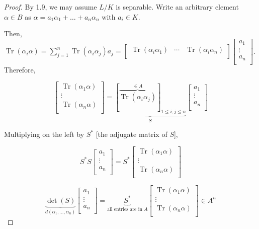 \documentclass[openany]{amsbook}
\numberwithin{section}{chapter}
\theoremstyle{definition}
\newcommand{\Tr}{\operatorname{Tr}}
\begin{document}
\begin{proof}
    By 1.9, we may assume \(L / K\) is separable. Write an arbitrary element \(\alpha \in B\) as \(\alpha = a_1 \alpha _1 + \dots + a_n \alpha_n\) with \(a_i \in K\).

    Then, \(\Tr(\alpha_i \alpha) = \sum_{j=1}^{n} \Tr(\alpha_i \alpha_j)a_j = \begin{bmatrix}
        \Tr(\alpha_i \alpha_1) & \cdots &  \Tr(\alpha_i \alpha_n)  \\
    \end{bmatrix}\begin{bmatrix}
        a_1 \\
        \vdots \\
        a_n \\
   \end{bmatrix}\). Therefore,

   \[
    \begin{bmatrix}
        \Tr(\alpha_1 \alpha) \\
        \vdots \\
        \Tr(\alpha_n \alpha) \\
      \end{bmatrix}=\underbrace{[\overbrace{\Tr(\alpha_i \alpha_j)}^{\in A}]_{1 \leq i, j \leq n}}_{S} \begin{bmatrix}
             a_1 \\
             \vdots \\
             a_n \\
        \end{bmatrix}
   \]

    Multiplying on the left by \(S^{\ast}\) [the adjugate matrix of \(S\)],

    \[S^{\ast} S \begin{bmatrix}
         a_1 \\
         \vdots \\
         a_n \\
    \end{bmatrix} = S^{\ast} \begin{bmatrix}
         \Tr(\alpha_1 \alpha) \\
         \vdots \\
         \Tr(\alpha_n \alpha) \\
    \end{bmatrix}
    \] 

    \[\underbrace{\det(S)}_{d(\alpha_1, \dots , \alpha_n)} \begin{bmatrix}
        a_1 \\
        \vdots \\
        a_n \\
   \end{bmatrix} = \underbrace{S^{\ast}}_{\text{all entries are in } A} \begin{bmatrix}
        \Tr(\alpha_1 \alpha) \\
        \vdots \\
        \Tr(\alpha_n \alpha)\\
   \end{bmatrix} \in A^n
   \]


\end{proof}
\end{document}
